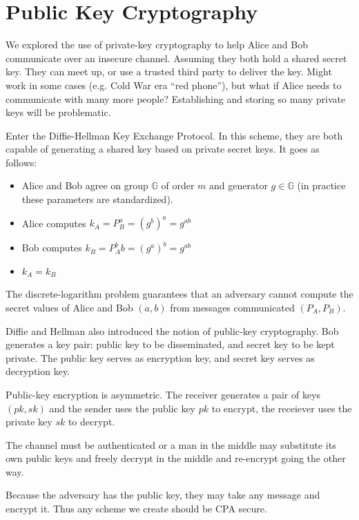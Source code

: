 \section{Public Key Cryptography}

We explored the use of private-key cryptography to help Alice and Bob
communicate over an insecure channel.
Assuming they both hold a shared secret key.
They can meet up, or use a trusted third party to deliver the key.
Might work in some cases (e.g. Cold War era “red phone”),
but what if Alice needs to communicate with many more people? Establishing and
storing so many private keys will be problematic.

Enter the Diffie-Hellman Key Exchange Protocol.
In this scheme, they are both capable of 
generating a shared key based on private secret 
keys. It goes as follows:
\begin{itemize}
    \item Alice and Bob agree on group $\mathbb{G}$ of 
    order $m$ and generator $g \in \mathbb{G}$
    (in practice these parameters are standardized).
    \item Alice computes $k_A = P_B^a = (g^b)^a = g^{ab}$
    \item Bob computes $k_B = P_A^bb = (g^a)^b = g^{ab}$
    \item $k_A = k_B$
\end{itemize}
The discrete-logarithm problem guarantees that an 
adversary cannot compute the
secret values of Alice and Bob $(a, b)$
from messages communicated $(P_A, P_B)$.

Diffie and Hellman also introduced the notion of public-key cryptography.
Bob generates a key pair: public key to be disseminated, and secret key to be kept
private. The public key serves as encryption key, 
and secret key serves as decryption key.

Public-key encryption is asymmetric. The receiver generates 
a pair of keys $(pk, sk)$ and the sender uses the public 
key $pk$ to encrypt, the receiever uses the private 
key $sk$ to decrypt. 

The channel must be authenticated or a man in the middle 
may substitute its own public keys and freely decrypt 
in the middle and re-encrypt going the other way. 

Because the adversary has the public key, they may take 
any message and encrypt it. Thus any scheme we create should 
be CPA secure. 